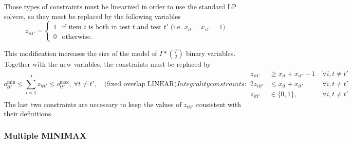 Those types of constraints must be linearized in order to use the standard LP solvers, so they must be replaced by the following variables
\begin{equation*}\label{eq:Mmod:Mol}
z_{itt'}=
\begin{cases}
1 & \mbox{if item }i \mbox{ is both in test }t \mbox{ and test } t' \mbox{ (i.e. }x_{it}=x_{it'}=1 \mbox{)} \\
0 & \mbox{otherwise}.
\end{cases}
\end{equation*}

This modification increases the size of the model of $I*{{T}\choose{2}}$ binary variables.
Together with the new variables, the constraints must be replaced by
\begin{subequations}[resume]
	\begin{equation}    \label{eq:Mmod:MOL}
	o^{\min}_{tt'} \le \sum_{i=1}^I{z_{itt'}} \le o^{\max}_{tt'}, \ \forall t \neq t', \quad \mbox{(fixed overlap LINEAR)}
	\end{equation}
	Integrality constraints:
	\begin{alignat}{2}
	\label{eq:Mmod:Mic1}
	z_{iit'} & \ge x_{it}+x_{it'}-1 \ & \forall i,t \neq t'\\
	\label{eq:Mmod:Mic2}
	2 z_{iit'} & \le x_{it}+x_{it'} \ & \forall i,t \neq t'\\
	\nonumber
	z_{itt'} & \in \{0,1\}, \ & \forall i,t \neq t'     
	\end{alignat}
	
\end{subequations}
The last two constraints are necessary to keep the values of $z_{itt'}$ consistent with their definitions.

\subsubsection{Multiple MINIMAX}

